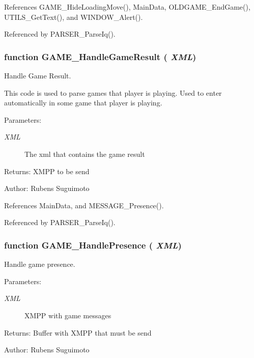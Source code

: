 References GAME\_\-HideLoadingMove(), MainData, OLDGAME\_\-EndGame(), UTILS\_\-GetText(), and WINDOW\_\-Alert().

Referenced by PARSER\_\-ParseIq().
\subsubsection[GAME\_\-HandleGameResult]{\setlength{\rightskip}{0pt plus 5cm}function GAME\_\-HandleGameResult ( {\em XML})}\label{game_2game_8js_a08f6f8448c74e8c6fcb62cd92002c5e}


Handle Game Result. 

This code is used to parse games that player is playing. Used to enter automatically in some game that player is playing.

\begin{Desc}
\item[Parameters:]
\begin{description}
\item[{\em XML}]The xml that contains the game result \end{description}
\end{Desc}
\begin{Desc}
\item[Returns:]XMPP to be send \end{Desc}
\begin{Desc}
\item[Author:]Rubens Suguimoto \end{Desc}


References MainData, and MESSAGE\_\-Presence().

Referenced by PARSER\_\-ParseIq().
\subsubsection[GAME\_\-HandlePresence]{\setlength{\rightskip}{0pt plus 5cm}function GAME\_\-HandlePresence ( {\em XML})}\label{game_2game_8js_7b7dbe9fc7c90363f0ca724205ae89fc}


Handle game presence. 

\begin{Desc}
\item[Parameters:]
\begin{description}
\item[{\em XML}]XMPP with game messages \end{description}
\end{Desc}
\begin{Desc}
\item[Returns:]Buffer with XMPP that must be send \end{Desc}
\begin{Desc}
\item[Author:]Rubens Suguimoto \end{Desc}


